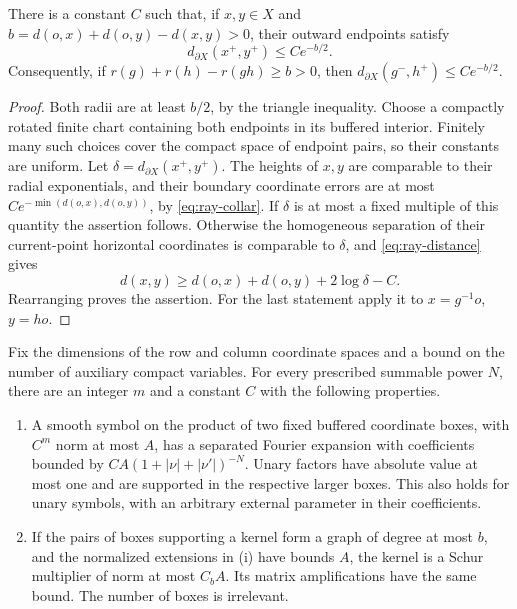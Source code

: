 \begin{lemma}\label{lem:ray-defect}
There is a constant \(C\) such that, if \(x,y\in X\) and
\(b=d(o,x)+d(o,y)-d(x,y)>0\), their outward endpoints satisfy
\[
                   d_{\partial X}(x^+,y^+)\le Ce^{-b/2}.
\]
Consequently, if \(r(g)+r(h)-r(gh)\ge b>0\), then
\(d_{\partial X}(g^-,h^+)\le Ce^{-b/2}\).
\end{lemma}

\begin{proof}
Both radii are at least \(b/2\), by the triangle inequality.
Choose a compactly rotated finite chart containing both endpoints
in its buffered interior.  Finitely many such choices cover the
compact space of endpoint pairs, so their constants are uniform.
Let \(\delta=d_{\partial X}(x^+,y^+)\).  The heights of \(x,y\)
are comparable to their radial exponentials, and their boundary
coordinate errors are at most \(Ce^{-\min(d(o,x),d(o,y))}\), by
\eqref{eq:ray-collar}.  If \(\delta\) is at most a fixed
multiple of this quantity the assertion follows.  Otherwise the
homogeneous separation of their current-point horizontal coordinates
is comparable to \(\delta\), and
\eqref{eq:ray-distance} gives
\[
 d(x,y)\ge d(o,x)+d(o,y)+2\log\delta-C.
\]
Rearranging proves the assertion.  For the last statement apply it
to \(x=g^{-1}o\), \(y=ho\).
\end{proof}

\begin{lemma}\label{lem:ray-cells}
Fix the dimensions of the row and column coordinate spaces and a bound
on the number of auxiliary compact variables.  For every prescribed
summable power \(N\), there are an integer \(m\) and a constant \(C\)
with the following properties.
\begin{enumerate}[label=(\roman*)]
\item A smooth symbol on the product of two fixed buffered coordinate
boxes, with \(C^m\) norm at most \(A\), has a separated Fourier
expansion with coefficients bounded by
\(CA(1+|\nu|+|\nu'|)^{-N}\).  Unary factors have absolute value at
most one and are supported in the respective larger boxes.  This also
holds for unary symbols, with an arbitrary external parameter in their
coefficients.
\item If the pairs of boxes supporting a kernel form a graph of degree
at most \(b\), and the normalized extensions in (i) have bounds \(A\),
the kernel is a Schur multiplier of norm at most \(C_b A\).
Its matrix amplifications have the same bound.  The number of boxes is
irrelevant.
\end{enumerate}
\end{lemma}

